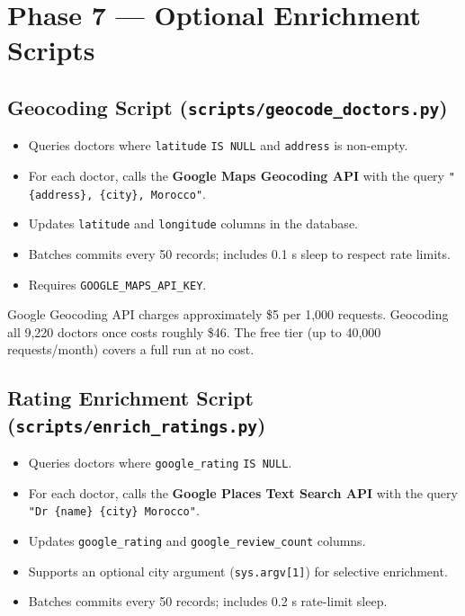 \documentclass[12pt, a4paper]{article}
\newcommand{\file}[1]{\texttt{\color{accent}#1}}
\newcommand{\envvar}[1]{\texttt{\color{warning}#1}}
\newcommand{\col}[1]{\texttt{\color{teal}#1}}
\begin{document}
\section{Phase 7 — Optional Enrichment Scripts}

\subsection{Geocoding Script (\file{scripts/geocode\_doctors.py})}

\begin{itemize}[leftmargin=*, itemsep=3pt]
  \item Queries doctors where \col{latitude} \texttt{IS NULL} and
        \texttt{address} is non-empty.
  \item For each doctor, calls the \textbf{Google Maps Geocoding API}
        with the query \texttt{"\{address\}, \{city\}, Morocco"}.
  \item Updates \col{latitude} and \col{longitude} columns in the database.
  \item Batches commits every 50 records; includes 0.1 s sleep to
        respect rate limits.
  \item Requires \envvar{GOOGLE\_MAPS\_API\_KEY}.
\end{itemize}

\begin{warningbox}[title={Cost Estimate}]
  Google Geocoding API charges approximately \$5 per 1,000 requests.
  Geocoding all 9,220 doctors once costs roughly \$46.
  The free tier (up to 40,000 requests/month) covers a full run at no cost.
\end{warningbox}

\subsection{Rating Enrichment Script (\file{scripts/enrich\_ratings.py})}

\begin{itemize}[leftmargin=*, itemsep=3pt]
  \item Queries doctors where \col{google\_rating} \texttt{IS NULL}.
  \item For each doctor, calls the \textbf{Google Places Text Search API}
        with the query \texttt{"Dr \{name\} \{city\} Morocco"}.
  \item Updates \col{google\_rating} and
        \col{google\_review\_count} columns.
  \item Supports an optional city argument (\texttt{sys.argv[1]}) for
        selective enrichment.
  \item Batches commits every 50 records; includes 0.2 s rate-limit sleep.
\end{itemize}
\end{document}
